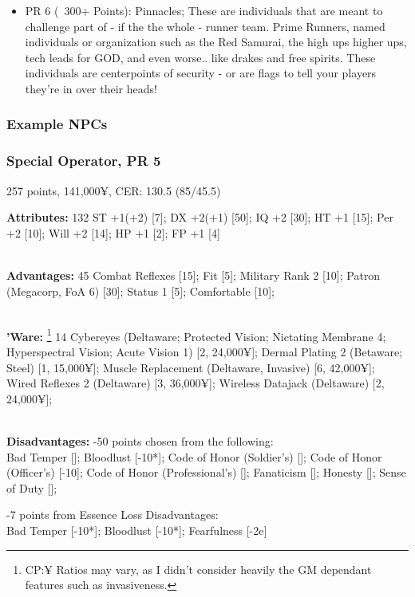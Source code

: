\begin{multicols*}{2}
\begin{itemize}
		\item PR 6 (~300+ Points): Pinnacles; These are individuals that are meant to challenge part of - if the the whole - runner team. Prime Runners, named individuals or organization such as the Red Samurai, the high ups higher ups, tech leads for GOD, and even worse.. like drakes and free spirits. These individuals are centerpoints of security - or are flags to tell your players they're in over their heads!
	\end{itemize}
	
	\subsubsection{Example NPCs}
	
	\subsubsection*{Special Operator, PR 5}
	\begin{flushright}
		257 points, 141,000¥, CER: 130.5 (85/45.5)
	\end{flushright}
	
	\textbf{Attributes: } 132
	ST +1(+2) [7]; DX +2(+1) [50]; IQ +2 [30]; HT +1 [15]; Per +2 [10]; Will +2 [14]; HP +1 [2]; FP +1 [4]
	
	\textbf{\\Advantages: } 45
	Combat Reflexes [15]; Fit [5]; Military Rank 2 [10]; Patron (Megacorp, FoA 6) [30]; Status 1 [5]; Comfortable [10];
	
	\textbf{\\'Ware: }\footnote{CP:¥ Ratios may vary, as I didn't consider heavily the GM dependant features such as invasiveness.} 14
	Cybereyes (Deltaware; Protected Vision; Nictating Membrane 4; Hyperspectral Vision; Acute Vision 1) [2, 24,000¥]; Dermal Plating 2 (Betaware; Steel) [1, 15,000¥]; Muscle Replacement (Deltaware, Invasive) [6, 42,000¥]; Wired Reflexes 2 (Deltaware) [3, 36,000¥]; Wireless Datajack (Deltaware) [2, 24,000¥];
	
	\textbf{\\Disadvantages: }
	-50 points chosen from the following:\\
	Bad Temper []; Bloodlust [-10*]; Code of Honor (Soldier's) []; Code of Honor (Officer's) [-10]; Code of Honor (Professional's) []; Fanaticism []; Honesty []; Sense of Duty [];
	
	-7 points from Essence Loss Disadvantages:\\
	Bad Temper [-10*]; Bloodlust [-10*]; Fearfulness [-2e]
	

\end{multicols*}
